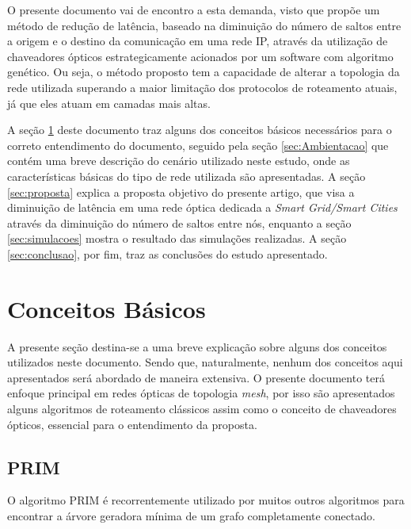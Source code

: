 \documentclass[12pt]{article}
\begin{document}
O presente documento vai de encontro a esta demanda, visto que propõe um método de redução de latência, baseado na diminuição do número de saltos entre a origem e o destino da comunicação em uma rede IP, através da utilização de chaveadores ópticos estrategicamente acionados por um software com algoritmo genético. Ou seja, o método proposto tem a capacidade de alterar a topologia da rede utilizada superando a maior limitação dos protocolos de roteamento atuais, já que eles atuam em camadas mais altas.

A seção \ref{sec:conceitos-basicos} deste documento traz alguns dos conceitos básicos necessários para o correto entendimento do documento, seguido pela seção \ref{sec:Ambientacao} que contém uma breve descrição do cenário utilizado neste estudo, onde as características básicas do tipo de rede utilizada são apresentadas. A seção \ref{sec:proposta} explica a proposta objetivo do presente artigo, que visa a diminuição de latência em uma rede óptica dedicada a \emph{Smart Grid/Smart Cities} através da diminuição do número de saltos entre nós, enquanto a seção \ref{sec:simulacoes} mostra o resultado das simulações realizadas. A seção \ref{sec:conclusao}, por fim, traz as conclusões do estudo apresentado.

\section{Conceitos Básicos}
\label{sec:conceitos-basicos}

A presente seção destina-se a uma breve explicação sobre alguns dos conceitos utilizados neste documento. Sendo que, naturalmente, nenhum dos conceitos aqui apresentados será abordado de maneira extensiva. O presente documento terá enfoque principal em redes ópticas de topologia \emph{mesh}, por isso são apresentados alguns algoritmos de roteamento clássicos assim como o conceito de chaveadores ópticos, essencial para o entendimento da proposta.

\subsection{PRIM}
\label{subsec:Prim}
O algoritmo PRIM é recorrentemente utilizado por muitos outros algoritmos para encontrar a árvore geradora mínima de um grafo completamente conectado. %
\end{document}

